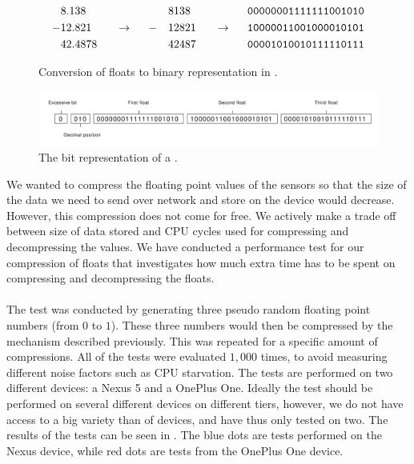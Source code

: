 \begin{figure}[!htbp]
    \begin{alignat*}{6}
       &8.138   &&                   &&   && 8138  &&                   && \text{\texttt{00000001111111001010}} \\
      -&12.821  && ~~ \rightarrow ~~ && - && 12821 && ~~ \rightarrow ~~ && \text{\texttt{10000011001000010101}} \\
       &42.4878 &&                   &&   && 42487 &&                   && \text{\texttt{00001010010111110111}} 
    \end{alignat*}
    \caption{Conversion of floats to binary representation in .}
    \label{fig:float_triple_convert}
\end{figure}
\FloatBarrier

\begin{figure}[!htbp]
    \centering
    \includegraphics[width=\textwidth]{graphic/gathering_sensor_data/float_triple_bit}
    \caption{The bit representation of a .}
    \label{fig:float_triple_bit}
\end{figure}
\FloatBarrier

We wanted to compress the floating point values of the sensors so that the size of the data we need to send over network and store on the device would decrease. However, this compression does not come for free. We actively make a trade off between size of data stored and CPU cycles used for compressing and decompressing the values. We have conducted a performance test for our compression of floats that investigates how much extra time has to be spent on compressing and decompressing the floats. 
\\\\
The test was conducted by generating three pseudo random floating point numbers (from $0$ to $1$). These three numbers would then be compressed by the mechanism described previously. This was repeated for a specific amount of compressions. All of the tests were evaluated $1,000$ times, to avoid measuring different noise factors such as CPU starvation. The tests are performed on two different devices: a Nexus 5 and a OnePlus One. Ideally the test should be performed on several different devices on different tiers, however, we do not have access to a big variety than of devices, and have thus only tested on two. The results of the tests can be seen in . The blue dots are tests performed on the Nexus device, while red dots are tests from the OnePlus One device.

